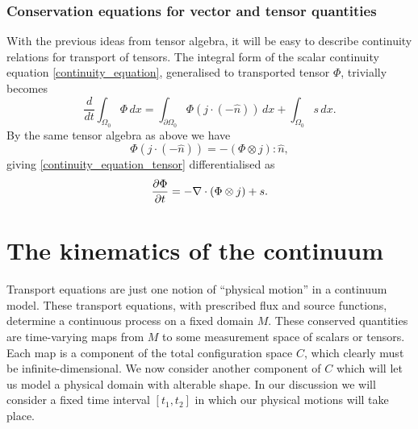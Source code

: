 \subsubsection{Conservation equations for vector and tensor quantities}
With the previous ideas from tensor algebra, it will be easy to describe continuity relations for transport of tensors. The integral form of the scalar continuity equation \eqref{continuity_equation}, generalised to transported tensor $\Phi$, trivially becomes
\begin{equation}\label{continuity_equation_tensor}
    \frac{d}{dt} \int_{\Omega_0} \Phi\,dx = \int_{\partial\Omega_0} \Phi \left(j\cdot (-\hat{n})\right)\,dx + \int_{\Omega_0} s\,dx.
\end{equation}
By the same tensor algebra as above we have
    $$
        \Phi \left(j\cdot (-\hat{n})\right) = -\left(\Phi \otimes j\right) : \hat{n},
    $$
giving \eqref{continuity_equation_tensor} differentialised as
\begin{equation}\label{continuity_equation_tensor_differential}
    \frac{\partial \Phi}{\partial t} = -\nabla\cdot (\Phi \otimes j) + s.
\end{equation}

\section{The kinematics of the continuum}
Transport equations are just one notion of ``physical motion'' in a continuum model.
These transport equations, with prescribed flux and source functions, determine a continuous process on a fixed
domain $M$. These conserved quantities are time-varying maps from $M$ to some measurement space of scalars or tensors.
Each map is a component of the total configuration space $C$, which clearly must be infinite-dimensional.
We now consider another component of $C$
which will let us model a physical domain with alterable shape.
In our discussion we will consider a fixed time interval $[t_1, t_2]$ in which our physical motions will take place.
